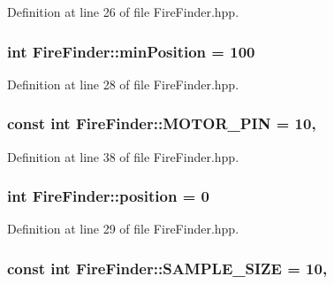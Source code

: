 Definition at line 26 of file Fire\-Finder.\-hpp.

\hypertarget{classFireFinder_ad8be0837d88f10d65b6f8a405f29494a}{
\subsubsection[{min\-Position}]{\setlength{\rightskip}{0pt plus 5cm}int Fire\-Finder\-::min\-Position = 100\hspace{0.3cm}{\ttfamily [private]}}}\label{classFireFinder_ad8be0837d88f10d65b6f8a405f29494a}


Definition at line 28 of file Fire\-Finder.\-hpp.

\hypertarget{classFireFinder_ac29b178da56a9347787371708bb62a20}{
\subsubsection[{M\-O\-T\-O\-R\-\_\-\-P\-I\-N}]{\setlength{\rightskip}{0pt plus 5cm}const int Fire\-Finder\-::\-M\-O\-T\-O\-R\-\_\-\-P\-I\-N = 10\hspace{0.3cm}{\ttfamily [static]}, {\ttfamily [private]}}}\label{classFireFinder_ac29b178da56a9347787371708bb62a20}


Definition at line 38 of file Fire\-Finder.\-hpp.

\hypertarget{classFireFinder_a40e204a2807939b3195024f14a9278fc}{
\subsubsection[{position}]{\setlength{\rightskip}{0pt plus 5cm}int Fire\-Finder\-::position = 0\hspace{0.3cm}{\ttfamily [private]}}}\label{classFireFinder_a40e204a2807939b3195024f14a9278fc}


Definition at line 29 of file Fire\-Finder.\-hpp.

\hypertarget{classFireFinder_a2136ca4e2438b84b0f4f3864697d51b1}{
\subsubsection[{S\-A\-M\-P\-L\-E\-\_\-\-S\-I\-Z\-E}]{\setlength{\rightskip}{0pt plus 5cm}const int Fire\-Finder\-::\-S\-A\-M\-P\-L\-E\-\_\-\-S\-I\-Z\-E = 10\hspace{0.3cm}{\ttfamily [static]}, {\ttfamily [private]}}}\label{classFireFinder_a2136ca4e2438b84b0f4f3864697d51b1}


